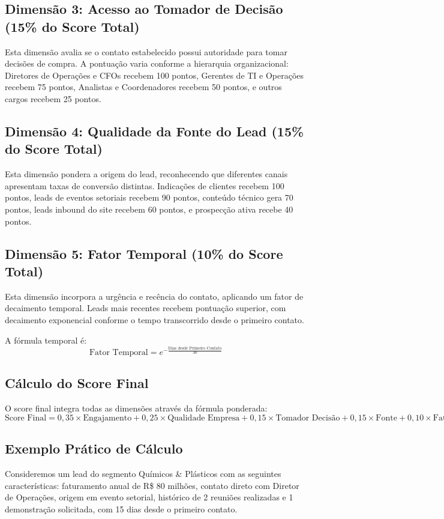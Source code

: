 \documentclass[portuguese,11pt]{article}
\begin{document}
\subsection{Dimensão 3: Acesso ao Tomador de Decisão (15\% do Score Total)}
Esta dimensão avalia se o contato estabelecido possui autoridade para tomar decisões de compra. A pontuação varia conforme a hierarquia organizacional: Diretores de Operações e CFOs recebem 100 pontos, Gerentes de TI e Operações recebem 75 pontos, Analistas e Coordenadores recebem 50 pontos, e outros cargos recebem 25 pontos.

\subsection{Dimensão 4: Qualidade da Fonte do Lead (15\% do Score Total)}
Esta dimensão pondera a origem do lead, reconhecendo que diferentes canais apresentam taxas de conversão distintas. Indicações de clientes recebem 100 pontos, leads de eventos setoriais recebem 90 pontos, conteúdo técnico gera 70 pontos, leads inbound do site recebem 60 pontos, e prospecção ativa recebe 40 pontos.

\subsection{Dimensão 5: Fator Temporal (10\% do Score Total)}
Esta dimensão incorpora a urgência e recência do contato, aplicando um fator de decaimento temporal. Leads mais recentes recebem pontuação superior, com decaimento exponencial conforme o tempo transcorrido desde o primeiro contato.

A fórmula temporal é:
\begin{equation}
\text{Fator Temporal} = e^{-\frac{\text{Dias desde Primeiro Contato}}{30}}
\end{equation}

\subsection{Cálculo do Score Final}
O score final integra todas as dimensões através da fórmula ponderada:
\begin{equation}
\text{Score Final} = 0,35 \times \text{Engajamento} + 0,25 \times \text{Qualidade Empresa} + 0,15 \times \text{Tomador Decisão} + 0,15 \times \text{Fonte} + 0,10 \times \text{Fator Temporal}
\end{equation}

\subsection{Exemplo Prático de Cálculo}
Consideremos um lead do segmento Químicos \& Plásticos com as seguintes características: faturamento anual de R\$ 80 milhões, contato direto com Diretor de Operações, origem em evento setorial, histórico de 2 reuniões realizadas e 1 demonstração solicitada, com 15 dias desde o primeiro contato.
\end{document}
